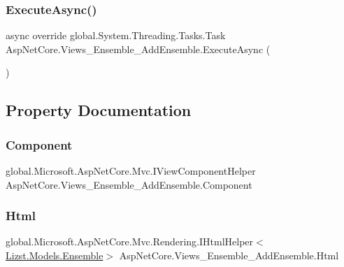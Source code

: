\subsubsection{\texorpdfstring{ExecuteAsync()}{ExecuteAsync()}}
{\footnotesize\ttfamily async override global.\+System.\+Threading.\+Tasks.\+Task Asp\+Net\+Core.\+Views\+\_\+\+Ensemble\+\_\+\+Add\+Ensemble.\+Execute\+Async (\begin{DoxyParamCaption}{ }\end{DoxyParamCaption})}



\subsection{Property Documentation}
\mbox{\label{class_asp_net_core_1_1_views___ensemble___add_ensemble_aa5e3d231a827a6c0b1a16304d8ccd4c7}} 
\subsubsection{\texorpdfstring{Component}{Component}}
{\footnotesize\ttfamily global.\+Microsoft.\+Asp\+Net\+Core.\+Mvc.\+I\+View\+Component\+Helper Asp\+Net\+Core.\+Views\+\_\+\+Ensemble\+\_\+\+Add\+Ensemble.\+Component\hspace{0.3cm}{\ttfamily [get]}}

\mbox{\label{class_asp_net_core_1_1_views___ensemble___add_ensemble_ab93ba1042a30cf14c45b1e536ee007cc}} 
\subsubsection{\texorpdfstring{Html}{Html}}
{\footnotesize\ttfamily global.\+Microsoft.\+Asp\+Net\+Core.\+Mvc.\+Rendering.\+I\+Html\+Helper$<$\mbox{\hyperlink{class_lizst_1_1_models_1_1_ensemble}{Lizst.\+Models.\+Ensemble}}$>$ Asp\+Net\+Core.\+Views\+\_\+\+Ensemble\+\_\+\+Add\+Ensemble.\+Html\hspace{0.3cm}{\ttfamily [get]}}

